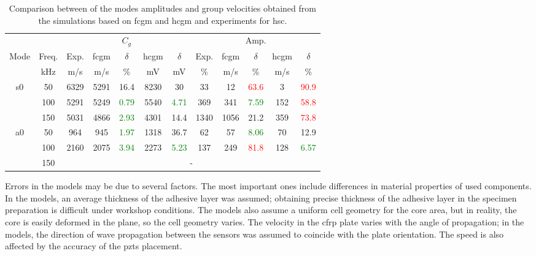 \begin{table}[H]
	\small
	\tabcolsep=0.15cm
	\centering
	\caption{\label{tab:group_velocity_hsc} Comparison between of the modes amplitudes and group velocities obtained from the simulations based on \acf{fcgm} and \acf{hcgm} and experiments for \acf{hsc}.}
	\begin{tabular}{cccccccccccc}
		\toprule
		& & \multicolumn{5}{c}{\(C_g\)} & \multicolumn{5}{c}{Amp.}\\
		\multirow{2}{*}{Mode} & Freq.& Exp. & \ac{fcgm} & \(\delta\) & \ac{hcgm} & \(\delta\) &  Exp. & \ac{fcgm} & \(\delta\) & \ac{hcgm} & \(\delta\)\\
		& \unit{\kHz} & \unit[per-mode = symbol]{\m\per\s} & \unit[per-mode = symbol]{\m\per\s} & \% & \unit{\mV} & \unit{\mV} & \% & \unit[per-mode = symbol]{\m\per\s} & \%& \unit[per-mode = symbol]{\m\per\s} & \% \\
		\midrule
		\multirow{3}{*}{\ac{s0}} & 50 & 6329 & 5291 & {16.4} & 8230 & 30 & 33 & 12 & \textcolor{red}{63.6} & 3 & \textcolor{red}{90.9} \\
		&100& 5291 & 5249 & \textcolor{green}{0.79} & 5540 & \textcolor{green}{4.71} & 369 & 341 & \textcolor{green}{7.59} & 152 & \textcolor{red}{58.8}\\
		&150& 5031 & 4866 & \textcolor{green}{2.93} & 4301 & 14.4 & 1340 & 1056 & {21.2} & 359 & \textcolor{red}{73.8} \\
		\midrule
		\multirow{3}{*}{\ac{a0}} & 50 & 964 & 945 & \textcolor{green}{1.97} & 1318 & 36.7 & 62 & 57 & \textcolor{green}{8.06} & 70 & 12.9\\
		& 100 & 2160 & 2075 & \textcolor{green}{3.94} & 2273 & \textcolor{green}{5.23} & 137 & 249 & \textcolor{red}{81.8} & 128 & \textcolor{green}{6.57}\\
		& 150 & \multicolumn{10}{c}{-}\\
		\bottomrule
	\end{tabular}
\end{table}
Errors in the models may be due to several factors.
The most important ones include differences in material properties of used components.
In the models, an average thickness of the adhesive layer was assumed; obtaining precise thickness of the adhesive layer in the specimen preparation is difficult under workshop conditions.
The models also assume a uniform cell geometry for the core area, but in reality, the core is easily deformed in the plane, so the cell geometry varies.
The velocity in the \ac{cfrp} plate varies with the angle of propagation; in the models, the direction of wave propagation between the sensors was assumed to coincide with the plate orientation.
The speed is also affected by the accuracy of the \acp{pzt} placement.
